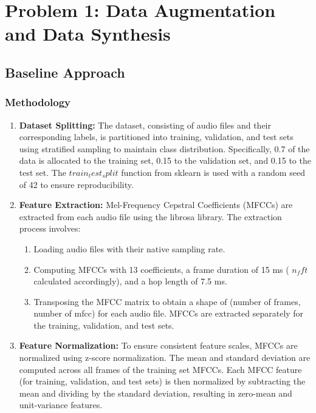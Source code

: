 \documentclass[12pt]{article}
\begin{document}
\section{Problem 1: Data Augmentation and Data Synthesis}
\subsection{Baseline Approach}
\subsubsection{Methodology}
\begin{enumerate}
    \item \textbf{Dataset Splitting:} The dataset, consisting of audio files and their corresponding labels, is partitioned into training, validation, and test sets using stratified sampling to maintain class distribution. Specifically, 0.7 of the data is allocated to the training set, 0.15 to the validation set, and 0.15 to the test set. The
    \(train_test_split\) function from sklearn is used with a random seed of 42 to ensure reproducibility.

    \item \textbf{Feature Extraction:} Mel-Frequency Cepstral Coefficients (MFCCs) are extracted from each audio file using the librosa library. The extraction process involves:

        \begin{enumerate}
            \item  Loading audio files with their native sampling rate.
            \item Computing MFCCs with 13 coefficients, a frame duration of 15 ms ( \(n_fft\) calculated accordingly), and a hop length of 7.5 ms.
            \item Transposing the MFCC matrix to obtain a shape of (number of frames, number of mfcc) for each audio file. MFCCs are extracted separately for the training, validation, and test sets.
        \end{enumerate}


    \item \textbf{Feature Normalization:} To ensure consistent feature scales, MFCCs are normalized using z-score normalization. The mean and standard deviation are computed across all frames of the training set MFCCs. Each MFCC feature (for training, validation, and test sets) is then normalized by subtracting the mean and dividing by the standard deviation, resulting in zero-mean and unit-variance features.


\end{enumerate}
\end{document}
